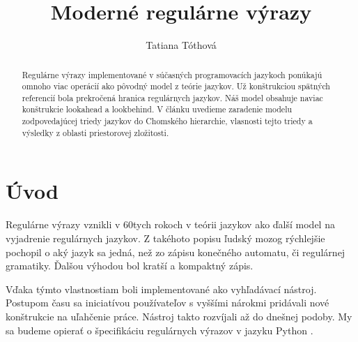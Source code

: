 \documentclass{svk_long_sk}
\begin{document}
\title{Moderné regulárne výrazy}

\author{Tatiana Tóthová
}




\maketitle

\begin{abstract}
Regulárne výrazy implementované v súčasných programovacích jazykoch ponúkajú omnoho viac operácií ako pôvodný model z teórie jazykov. Už konštrukciou spätných referencií bola prekročená hranica regulárnych jazykov. Náš model obsahuje naviac konštrukcie lookahead a lookbehind. V článku uvedieme zaradenie modelu zodpovedajúcej triedy jazykov do Chomského hierarchie, vlasnosti tejto triedy a výsledky z oblasti priestorovej zložitosti.

\end{abstract}

\section{Úvod}
Regulárne výrazy vznikli v 60tych rokoch v teórii jazykov ako ďalší model na vyjadrenie regulárnych jazykov. Z takéhoto popisu ľudský mozog rýchlejšie pochopil o aký jazyk sa jedná, než zo zápisu konečného automatu, či regulárnej gramatiky. Ďalšou výhodou bol kratší a kompaktný zápis.

Vďaka týmto vlastnostiam boli implementované ako vyhľadávací nástroj. Postupom času sa iniciatívou používateľov s vyššími nárokmi pridávali nové konštrukcie na uľahčenie práce. Nástroj takto rozvíjali až do dnešnej podoby. My sa budeme opierať o špecifikáciu regulárnych výrazov v jazyku Python \cite{Python3Documentation}.
\end{document}
